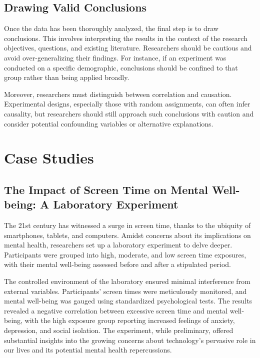 \documentclass[
  b5paper]{book}
\begin{document}
\hypertarget{drawing-valid-conclusions}{%
\subsection*{Drawing Valid Conclusions}\label{drawing-valid-conclusions}}

Once the data has been thoroughly analyzed, the final step is to draw conclusions. This involves interpreting the results in the context of the research objectives, questions, and existing literature. Researchers should be cautious and avoid over-generalizing their findings. For instance, if an experiment was conducted on a specific demographic, conclusions should be confined to that group rather than being applied broadly.

Moreover, researchers must distinguish between correlation and causation. Experimental designs, especially those with random assignments, can often infer causality, but researchers should still approach such conclusions with caution and consider potential confounding variables or alternative explanations.

\hypertarget{case-studies-5}{%
\section{Case Studies}\label{case-studies-5}}

\hypertarget{the-impact-of-screen-time-on-mental-well-being-a-laboratory-experiment}{%
\subsection*{The Impact of Screen Time on Mental Well-being: A Laboratory Experiment}\label{the-impact-of-screen-time-on-mental-well-being-a-laboratory-experiment}}

The 21st century has witnessed a surge in screen time, thanks to the ubiquity of smartphones, tablets, and computers. Amidst concerns about its implications on mental health, researchers set up a laboratory experiment to delve deeper. Participants were grouped into high, moderate, and low screen time exposures, with their mental well-being assessed before and after a stipulated period.

The controlled environment of the laboratory ensured minimal interference from external variables. Participants' screen times were meticulously monitored, and mental well-being was gauged using standardized psychological tests. The results revealed a negative correlation between excessive screen time and mental well-being, with the high exposure group reporting increased feelings of anxiety, depression, and social isolation. The experiment, while preliminary, offered substantial insights into the growing concerns about technology's pervasive role in our lives and its potential mental health repercussions.
\end{document}
